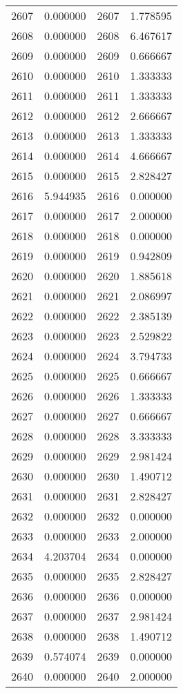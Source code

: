 \documentclass[12pt]{article}
\begin{document}
\begin{longtable}{@{}cccc@{}}
2607 & 0.000000 & 2607 & 1.778595 \\
2608 & 0.000000 & 2608 & 6.467617 \\
2609 & 0.000000 & 2609 & 0.666667 \\
2610 & 0.000000 & 2610 & 1.333333 \\
2611 & 0.000000 & 2611 & 1.333333 \\
2612 & 0.000000 & 2612 & 2.666667 \\
2613 & 0.000000 & 2613 & 1.333333 \\
2614 & 0.000000 & 2614 & 4.666667 \\
2615 & 0.000000 & 2615 & 2.828427 \\
2616 & 5.944935 & 2616 & 0.000000 \\
2617 & 0.000000 & 2617 & 2.000000 \\
2618 & 0.000000 & 2618 & 0.000000 \\
2619 & 0.000000 & 2619 & 0.942809 \\
2620 & 0.000000 & 2620 & 1.885618 \\
2621 & 0.000000 & 2621 & 2.086997 \\
2622 & 0.000000 & 2622 & 2.385139 \\
2623 & 0.000000 & 2623 & 2.529822 \\
2624 & 0.000000 & 2624 & 3.794733 \\
2625 & 0.000000 & 2625 & 0.666667 \\
2626 & 0.000000 & 2626 & 1.333333 \\
2627 & 0.000000 & 2627 & 0.666667 \\
2628 & 0.000000 & 2628 & 3.333333 \\
2629 & 0.000000 & 2629 & 2.981424 \\
2630 & 0.000000 & 2630 & 1.490712 \\
2631 & 0.000000 & 2631 & 2.828427 \\
2632 & 0.000000 & 2632 & 0.000000 \\
2633 & 0.000000 & 2633 & 2.000000 \\
2634 & 4.203704 & 2634 & 0.000000 \\
2635 & 0.000000 & 2635 & 2.828427 \\
2636 & 0.000000 & 2636 & 0.000000 \\
2637 & 0.000000 & 2637 & 2.981424 \\
2638 & 0.000000 & 2638 & 1.490712 \\
2639 & 0.574074 & 2639 & 0.000000 \\
2640 & 0.000000 & 2640 & 2.000000 \\

\end{longtable}
\end{document}
